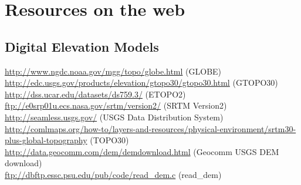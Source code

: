 


\section{Resources on the web}
\label{resources}



\subsection*{Digital Elevation Models}
\href{http://www.ngdc.noaa.gov/mgg/topo/globe.html}{http://www.ngdc.noaa.gov/mgg/topo/globe.html} (GLOBE) \\
\href{http://edc.usgs.gov/products/elevation/gtopo30/gtopo30.html}{http://edc.usgs.gov/products/elevation/gtopo30/gtopo30.html} (GTOPO30) \\
\href{http://dss.ucar.edu/datasets/ds759.3/}{http://dss.ucar.edu/datasets/ds759.3/} (ETOPO2) \\
\href{ftp://e0srp01u.ecs.nasa.gov/srtm/version2/}{ftp://e0srp01u.ecs.nasa.gov/srtm/version2/} (SRTM Version2) \\
\href{http://seamless.usgs.gov/}{http://seamless.usgs.gov/} (USGS Data Distribution System) \\
\href{http://comlmaps.org/how-to/layers-and-resources/physical-environment/srtm30-plus-global-topography}{http://comlmaps.org/how-to/layers-and-resources/physical-environment/srtm30-plus-global-topography} (TOPO30)\\
\href{http://data.geocomm.com/dem/demdownload.html}{http://data.geocomm.com/dem/demdownload.html} (Geocomm USGS DEM download) \\
\href{ftp://dbftp.essc.psu.edu/pub/code/read_dem.c}{ftp://dbftp.essc.psu.edu/pub/code/read\_dem.c} (read\_dem)






